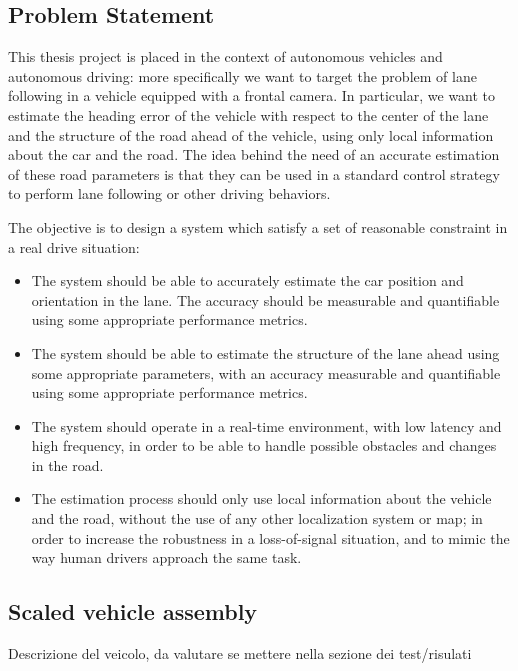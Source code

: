 \documentclass[a4paper,12pt,sort&compress]{article}
\begin{document}
\subsection{Problem Statement}
    This thesis project is placed in the context of autonomous vehicles and
    autonomous driving: more specifically we want to target the problem of lane
    following in a vehicle equipped with a frontal camera. In particular, we
    want to estimate the heading error of the vehicle with respect to the center
    of the lane and the structure of the road ahead of the vehicle, using only
    local information about the car and the road. The idea behind the need of an
    accurate estimation of these road parameters is that they can be used in a
    standard control strategy to perform lane following or other driving
    behaviors.

    The objective is to design a system which satisfy a set of reasonable
    constraint in a real drive situation:
    \begin{itemize}
        \item The system should be able to accurately estimate the car position and
            orientation in the lane. The accuracy should be measurable and
            quantifiable using some appropriate performance metrics.
        \item The system should be able to estimate the structure of the lane
            ahead using some appropriate parameters, with an accuracy measurable
            and quantifiable using some appropriate performance metrics.
        \item The system should operate in a real-time environment, with low
            latency and high frequency, in order to be able to handle possible
            obstacles and changes in the road.
        \item The estimation process should only use local information about the
            vehicle and the road, without the use of any other localization system
            or map; in order to increase the robustness in a loss-of-signal
            situation, and to mimic the way human drivers approach the same
            task.
    \end{itemize}

\subsection{Scaled vehicle assembly}
Descrizione del veicolo, da valutare se mettere nella sezione dei test/risulati
\end{document}
